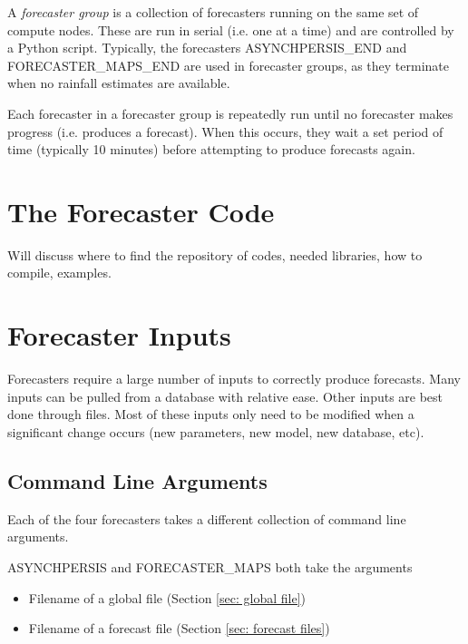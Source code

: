 \documentclass[12pt]{article}
\begin{document}
A \emph{forecaster group} is a collection of forecasters running on the same set of compute nodes. These are run in serial (i.e. one at a time) and are controlled by a Python script. Typically, the forecasters ASYNCHPERSIS\_END and FORECASTER\_MAPS\_END are used in forecaster groups, as they terminate when no rainfall estimates are available.

Each forecaster in a forecaster group is repeatedly run until no forecaster makes progress (i.e. produces a forecast). When this occurs, they wait a set period of time (typically 10 minutes) before attempting to produce forecasts again.



\section{The Forecaster Code} \label{sec: forecaster code}

Will discuss where to find the repository of codes, needed libraries, how to compile, examples.

\section{Forecaster Inputs} \label{sec: forecaster inputs}

Forecasters require a large number of inputs to correctly produce forecasts. Many inputs can be pulled from a database with relative ease. Other inputs are best done through files. Most of these inputs only need to be modified when a significant change occurs (new parameters, new model, new database, etc).

\subsection{Command Line Arguments} \label{sec: command line arguments}

Each of the four forecasters takes a different collection of command line arguments.

ASYNCHPERSIS and FORECASTER\_MAPS both take the arguments
\begin{itemize}
 \item Filename of a global file (Section \ref{sec: global file})
 \item Filename of a forecast file (Section \ref{sec: forecast files})
\end{itemize}
 
\end{document}
